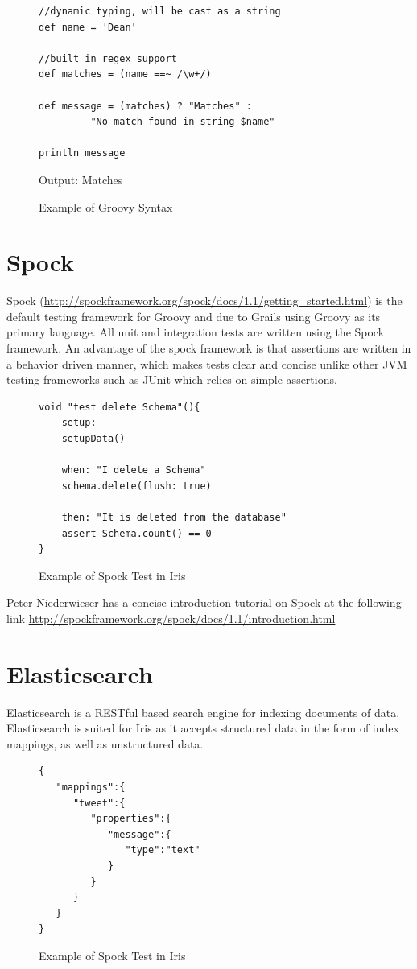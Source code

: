 \documentclass[12pt,a4paper,titlepage]{report}
\begin{document}
\begin{figure}[H]
\begin{tcolorbox}
\begin{verbatim}
//dynamic typing, will be cast as a string
def name = 'Dean'

//built in regex support
def matches = (name ==~ /\w+/)   

def message = (matches) ? "Matches" :
		 "No match found in string $name"

println message
\end{verbatim}
Output:
Matches
\end{tcolorbox}
\caption{Example of Groovy Syntax}
\end{figure}

\section{Spock}
Spock (\url{http://spockframework.org/spock/docs/1.1/getting_started.html}) is the default testing framework for Groovy and due to Grails using Groovy as its primary language. All unit and integration tests are written using the Spock framework. An advantage of the spock framework is that assertions are written in a behavior driven manner, which makes tests clear and concise unlike other JVM testing frameworks such as JUnit which relies on simple assertions.

\begin{figure}[H]
\begin{tcolorbox}
\begin{verbatim}
void "test delete Schema"(){
	setup:
	setupData()

	when: "I delete a Schema"
	schema.delete(flush: true)

	then: "It is deleted from the database"
	assert Schema.count() == 0
}
\end{verbatim}
\end{tcolorbox}
\caption{Example of Spock Test in Iris}
\end{figure}
Peter Niederwieser has a concise introduction tutorial on Spock at the following link \url{ http://spockframework.org/spock/docs/1.1/introduction.html }

\section{Elasticsearch}

Elasticsearch is a RESTful based search engine for indexing documents of data. Elasticsearch is suited for Iris as it accepts structured data in the form of index mappings, as well as unstructured data. 

\begin{figure}[H]
\begin{tcolorbox}
\begin{verbatim}
{
   "mappings":{
      "tweet":{
         "properties":{
            "message":{
               "type":"text"
            }
         }
      }
   }
}
\end{verbatim}
\end{tcolorbox}
\caption{Example of Spock Test in Iris}
\end{figure}
\end{document}
